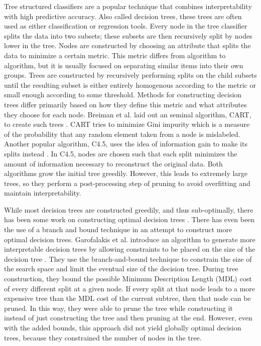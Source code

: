Tree structured classifiers are a popular technique that combines interpretability with high predictive accuracy.
Also called decision trees, these trees are often used as either classification or regression tools.
Every node in the tree classifier splits the data into two subsets; these subsets are then recursively split by nodes lower in the tree.
Nodes are constructed by choosing an attribute that splits the data to minimize a certain metric.
This metric differs from algorithm to algorithm, but it is usually focused on separating similar items into their own groups.%
Trees are constructed by recursively performing splits on the child subsets until the resulting subset is either entirely homogenous according to the metric or small enough according to some threshold.
Methods for constructing decision trees differ primarily based on how they define this metric and what attributes they choose for each node.
Breiman et al. laid out an seminal algorithm, CART, to create such trees \cite{BreimanFrOlSt84}.
CART tries to minimize Gini impurity which is a measure of the probability that any random element taken from a node is mislabeled.
Another popular algorithm, C4.5, uses the idea of information gain to make its splits instead \cite{Quinlan93}.
In C4.5, nodes are chosen such that each split minimizes the amount of information necessary to reconstruct the original data.
Both algorithms grow the initial tree greedily.
However, this leads to extremely large trees, so they perform a post-processing step of pruning to avoid overfitting and maintain interpretability.

While most decision trees are constructed greedily, and thus sub-optimally, there has been some work on constructing optimal decision trees \cite{Moret82}.
There has even been the use of a branch and bound technique in an attempt to construct more optimal decision trees.
Garofalakis et al. introduce an algorithm to generate more interpretable decision trees by allowing constraints to be placed on the size of the decision tree \cite{GarofalakisHyRaSh00}.
They use the branch-and-bound technique to constrain the size of the search space and limit the eventual size of the decision tree.
During tree construction, they bound the possible Minimum Description Length (MDL) cost of every different split at a given node.
If every split at that node leads to a more expensive tree than the MDL cost of the current subtree, then that node can be pruned.
In this way, they were able to prune the tree while constructing it instead of just constructing the tree and then pruning at the end.
However, even with the added bounds, this approach did not yield globally optimal decision trees, because they constrained the number of nodes in the tree.


